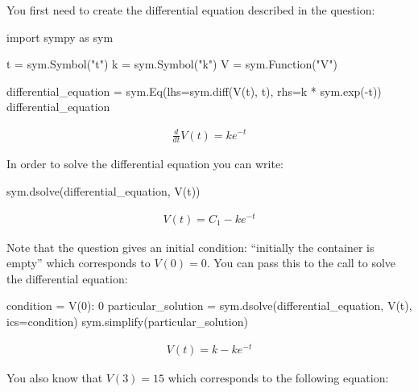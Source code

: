 You first need to create the differential equation described in the question:

\begin{pyin}
import sympy as sym

t = sym.Symbol("t")
k = sym.Symbol("k")
V = sym.Function("V")

differential_equation = sym.Eq(lhs=sym.diff(V(t), t), rhs=k * sym.exp(-t))
differential_equation
\end{pyin}




\begin{equation*}
\begin{split}\displaystyle \frac{d}{d t} V{\left(t \right)} = k e^{- t}\end{split}
\end{equation*}




In order to solve the differential equation you can write:




\begin{pyin}
sym.dsolve(differential_equation, V(t))
\end{pyin}




\begin{equation*}
\begin{split}\displaystyle V{\left(t \right)} = C_{1} - k e^{- t}\end{split}
\end{equation*}




Note that the question gives an initial condition: ``initially the container
is empty” which corresponds to \(V(0)=0\).
You can pass this to the call to solve the differential equation:




\begin{pyin}
condition = {V(0): 0}
particular_solution = sym.dsolve(differential_equation, V(t), ics=condition)
sym.simplify(particular_solution)
\end{pyin}




\begin{equation*}
\begin{split}\displaystyle V{\left(t \right)} = k - k e^{- t}\end{split}
\end{equation*}




You also know that \(V(3)=15\) which corresponds to the following equation:




